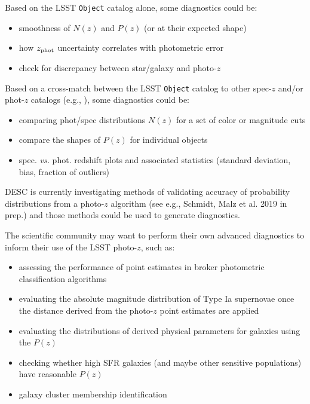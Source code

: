 \documentclass[DM,lsstdraft,toc]{lsstdoc}
\begin{document}
Based on the LSST {\tt Object} catalog alone, some diagnostics could be:
\begin{itemize}%
\item smoothness of $N(z)$ and $P(z)$ (or at their expected shape)
\item how $z_{\rm phot}$ uncertainty correlates with photometric error
\item check for discrepancy between star/galaxy and photo-$z$
\end{itemize}

Based on a cross-match between the LSST {\tt Object} catalog to other spec-$z$ and/or phot-$z$ catalogs (e.g., \citealt{2019MNRAS.488.4565Z}), some diagnostics could be:
\begin{itemize}%
\item comparing phot/spec distributions $N(z)$ for a set of color or magnitude cuts
\item compare the shapes of $P(z)$ for individual objects
\item spec. {\it vs.} phot. redshift plots and associated statistics (standard deviation, bias, fraction of outliers)
\end{itemize}

DESC is currently investigating methods of validating accuracy of probability distributions from a photo-$z$ algorithm (see e.g., Schmidt, Malz et al. 2019 in prep.) and those methods could be used to generate diagnostics.

The scientific community may want to perform their own advanced diagnostics to inform their use of the LSST photo-$z$, such as:
\begin{itemize}%
\item assessing the performance of point estimates in broker photometric classification algorithms
\item evaluating the absolute magnitude distribution of Type Ia supernovae once the distance derived from the photo-$z$ point estimates are applied
\item evaluating the distributions of derived physical parameters for galaxies using the $P(z)$
\item checking whether high SFR galaxies (and maybe other sensitive populations) have reasonable $P(z)$
\item galaxy cluster membership identification
\end{itemize}
\end{document}
